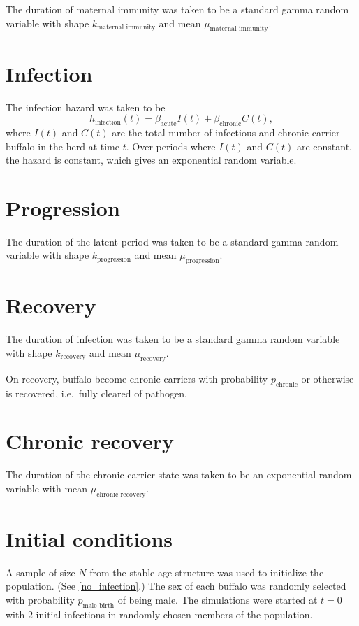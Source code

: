 \documentclass[12pt]{article}
\begin{document}
The duration of maternal immunity was taken to be a standard gamma
random variable with shape $k_{\text{maternal immunity}}$
and mean $\mu_{\text{maternal immunity}}$.


\section{Infection}

The infection hazard was taken to be
\begin{equation}
  h_{\text{infection}}(t) = \beta_{\text{acute}} I(t) +
  \beta_{\text{chronic}} C(t),
\end{equation}
where $I(t)$ and $C(t)$ are the total number of infectious and
chronic-carrier buffalo in the herd at time $t$.  Over periods where
$I(t)$ and $C(t)$ are constant, the hazard is constant, which gives an
exponential random variable.


\section{Progression}

The duration of the latent period was taken to be a standard gamma
random variable with shape $k_{\text{progression}}$
and mean $\mu_{\text{progression}}$.


\section{Recovery}

The duration of infection was taken to be a standard gamma random
variable with shape $k_{\text{recovery}}$ and mean
$\mu_{\text{recovery}}$.

On recovery, buffalo become chronic carriers with probability
$p_{\text{chronic}}$ or otherwise is recovered, i.e.~fully cleared
of pathogen.


\section{Chronic recovery}

The duration of the chronic-carrier state was taken to be an
exponential random variable with mean
$\mu_{\text{chronic recovery}}$.


\section{Initial conditions}

A sample of size $N$ from the stable age structure was used to
initialize the population.  (See \autoref{no_infection}.)  The sex of
each buffalo was randomly selected with probability
$p_{\text{male birth}}$ of being male.  The simulations were started
at $t = 0$ with $2$ initial infections in randomly chosen members of
the population.
\end{document}
